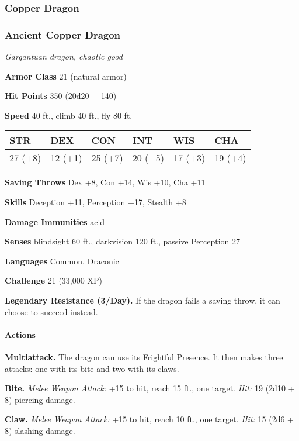 \documentclass[
]{article}
\begin{document}
\hypertarget{copper-dragon}{%
\subsubsection{Copper Dragon}\label{copper-dragon}}

\hypertarget{ancient-copper-dragon}{%
\subsubsection{Ancient Copper Dragon}\label{ancient-copper-dragon}}

\emph{Gargantuan dragon, chaotic good}

\textbf{Armor Class} 21 (natural armor)

\textbf{Hit Points} 350 (20d20 + 140)

\textbf{Speed} 40 ft., climb 40 ft., fly 80 ft.

\begin{longtable}[]{@{}llllll@{}}
\toprule
STR & DEX & CON & INT & WIS & CHA\tabularnewline
\midrule
\endhead
27 (+8) & 12 (+1) & 25 (+7) & 20 (+5) & 17 (+3) & 19 (+4)\tabularnewline
\bottomrule
\end{longtable}

\textbf{Saving Throws} Dex +8, Con +14, Wis +10, Cha +11

\textbf{Skills} Deception +11, Perception +17, Stealth +8

\textbf{Damage Immunities} acid

\textbf{Senses} blindsight 60 ft., darkvision 120 ft., passive
Perception 27

\textbf{Languages} Common, Draconic

\textbf{Challenge} 21 (33,000 XP)

\textbf{Legendary Resistance (3/Day).} If the dragon fails a saving
throw, it can choose to succeed instead.

\hypertarget{actions-51}{%
\paragraph{Actions}\label{actions-51}}

\textbf{Multiattack.} The dragon can use its Frightful Presence. It then
makes three attacks: one with its bite and two with its claws.

\textbf{Bite.} \emph{Melee Weapon Attack:} +15 to hit, reach 15 ft., one
target. \emph{Hit:} 19 (2d10 + 8) piercing damage.

\textbf{Claw.} \emph{Melee Weapon Attack:} +15 to hit, reach 10 ft., one
target. \emph{Hit:} 15 (2d6 + 8) slashing damage.
\end{document}
